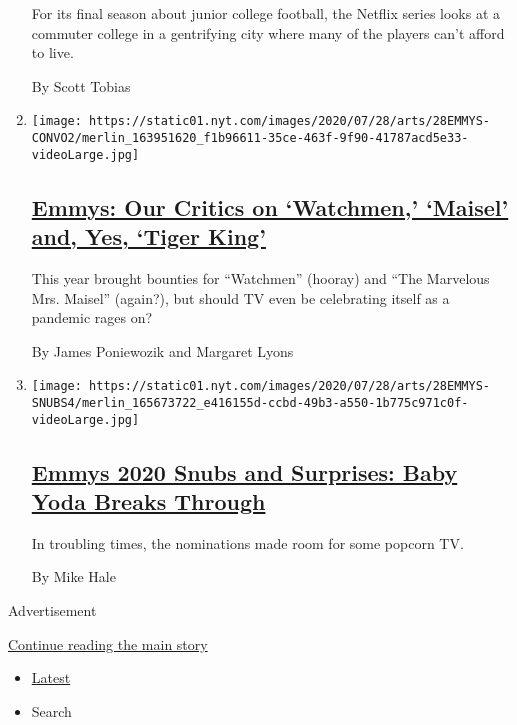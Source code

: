 \begin{enumerate}
  For its final season about junior college football, the Netflix series
  looks at a commuter college in a gentrifying city where many of the
  players can't afford to live.

  By Scott Tobias
\item
  \texttt{[image: https://static01.nyt.com/images/2020/07/28/arts/28EMMYS-CONVO2/merlin\_163951620\_f1b96611-35ce-463f-9f90-41787acd5e33-videoLarge.jpg]}

  \hypertarget{emmys-our-critics-on-watchmen-maisel-and-yes-tiger-king}{%
  \subsection{\texorpdfstring{\href{/2020/07/28/arts/television/emmys-watchmen-handmaids-tale-tiger-king.html}{Emmys:
  Our Critics on `Watchmen,' `Maisel' and, Yes, `Tiger
  King'}}{Emmys: Our Critics on `Watchmen,' `Maisel' and, Yes, `Tiger King'}}\label{emmys-our-critics-on-watchmen-maisel-and-yes-tiger-king}}

  This year brought bounties for ``Watchmen'' (hooray) and ``The
  Marvelous Mrs. Maisel'' (again?), but should TV even be celebrating
  itself as a pandemic rages on?

  By James Poniewozik and Margaret Lyons
\item
  \texttt{[image: https://static01.nyt.com/images/2020/07/28/arts/28EMMYS-SNUBS4/merlin\_165673722\_e416155d-ccbd-49b3-a550-1b775c971c0f-videoLarge.jpg]}

  \hypertarget{emmys-2020-snubs-and-surprises-baby-yoda-breaks-through}{%
  \subsection{\texorpdfstring{\href{/2020/07/28/arts/television/emmys-snubs-mandalorian-zendaya-reese.html}{Emmys
  2020 Snubs and Surprises: Baby Yoda Breaks
  Through}}{Emmys 2020 Snubs and Surprises: Baby Yoda Breaks Through}}\label{emmys-2020-snubs-and-surprises-baby-yoda-breaks-through}}

  In troubling times, the nominations made room for some popcorn TV.

  By Mike Hale
\end{enumerate}

Advertisement

\protect\hyperlink{after-mid1}{Continue reading the main story}

\begin{itemize}
\tightlist
\item
  \protect\hyperlink{stream-panel}{Latest}
\item
  Search
\end{itemize}

